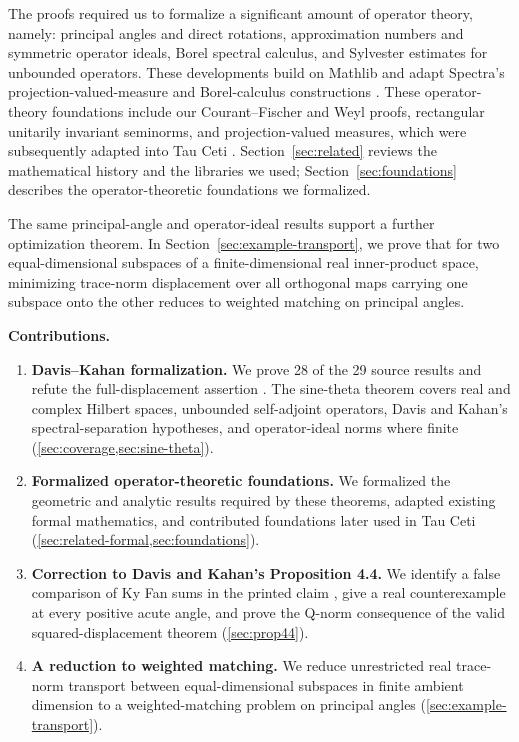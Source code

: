 \documentclass[pdflatex]{sn-jnl} %
\theoremstyle{thmstyleone}
\begin{document}
The proofs required us to formalize a significant amount of operator
theory, namely: principal angles and direct rotations, approximation numbers
and symmetric operator ideals, Borel spectral calculus, and Sylvester
estimates for unbounded operators. These developments build on Mathlib and
adapt Spectra's projection-valued-measure and Borel-calculus constructions
\citep{mathlib2020,bornemann2026spectra}.
These operator-theory foundations include our
Courant--Fischer and Weyl proofs, rectangular unitarily invariant seminorms,
and projection-valued measures, which were subsequently adapted into Tau
Ceti \citep{tauceti2026}.
Section~\ref{sec:related} reviews the mathematical history and the libraries
we used; Section~\ref{sec:foundations} describes the operator-theoretic
foundations we formalized.

The same principal-angle and operator-ideal results support a further
optimization theorem. In Section~\ref{sec:example-transport}, we prove that
for two equal-dimensional subspaces of a finite-dimensional real inner-product
space, minimizing trace-norm displacement over all orthogonal maps carrying
one subspace onto the other reduces to weighted matching on principal angles.

\noindent\textbf{Contributions.}
\begin{enumerate}
\item \textbf{Davis--Kahan formalization.} We prove 28 of the 29 source
results and refute the full-displacement assertion
\citep[Proposition~4.4]{davis1970rotation}. The sine-theta theorem covers real and
complex Hilbert spaces, unbounded self-adjoint operators, Davis and Kahan's
spectral-separation hypotheses, and operator-ideal norms where finite
(\cref{sec:coverage,sec:sine-theta}).
\item \textbf{Formalized operator-theoretic foundations.} We formalized the
geometric and analytic results required by these theorems, adapted existing
formal mathematics, and contributed foundations later used in Tau Ceti
(\cref{sec:related-formal,sec:foundations}).
\item \textbf{Correction to Davis and Kahan's Proposition 4.4.} We identify a false comparison
of Ky Fan sums in the printed claim \citep[Proposition~4.4]{davis1970rotation},
give a real counterexample at every positive acute angle,
and prove the Q-norm consequence of the valid squared-displacement theorem
(\cref{sec:prop44}).
\item \textbf{A reduction to weighted matching.} We reduce unrestricted
real trace-norm transport between equal-dimensional subspaces in finite
ambient dimension to a weighted-matching problem on principal angles
(\cref{sec:example-transport}).

\end{enumerate}
\end{document}
